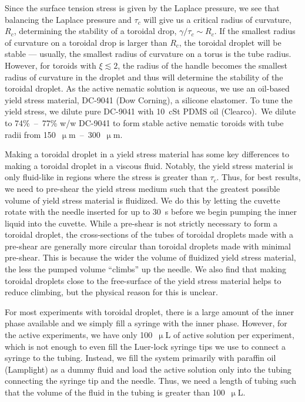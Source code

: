 Since the surface tension stress is given by the Laplace pressure, we see that balancing the Laplace pressure and $\tau_c$ will give us a critical radius of curvature, $R_c$, determining the stability of a toroidal drop, $\gamma/\tau_c \sim R_c$.
If the smallest radius of curvature on a toroidal drop is larger than $R_c$, the toroidal droplet will be stable --- usually, the smallest radius of curvature on a torus is the tube radius.
However, for toroids with $\xi \lesssim 2$, the radius of the handle becomes the smallest radius of curvature in the droplet and thus will determine the stability of the toroidal droplet.
As the active nematic solution is aqueous, we use an oil-based yield stress material, DC-9041 (Dow Corning), a silicone elastomer.
To tune the yield stress, we dilute pure DC-9041 with 10~cSt PDMS oil (Clearco).\
We dilute to 74\%~--~77\% w/w DC-9041 to form stable active nematic toroids with tube radii from 150~$\upmu$m~--~300~$\upmu$m.

Making a toroidal droplet in a yield stress material has some key differences to making a toroidal droplet in a viscous fluid.
Notably, the yield stress material is only fluid-like in regions where the stress is greater than $\tau_c$.
Thus, for best results, we need to pre-shear the yield stress medium such that the greatest possible volume of yield stress material is fluidized.
We do this by letting the cuvette rotate with the needle inserted for up to 30~s before we begin pumping the inner liquid into the cuvette.
While a pre-shear is not strictly necessary to form a toroidal droplet, the cross-sections of the tubes of toroidal droplets made with a pre-shear are generally more circular than toroidal droplets made with minimal pre-shear.
This is because the wider the volume of fluidized yield stress material, the less the pumped volume ``climbs'' up the needle.
We also find that making toroidal droplets close to the free-surface of the yield stress material helps to reduce climbing, but the physical reason for this is unclear.

For most experiments with toroidal droplet, there is a large amount of the inner phase available and we simply fill a syringe with the inner phase.
However, for the active experiments, we have only 100~$\upmu$L of active solution per experiment, which is not enough to even fill the Luer-lock syringe tips we use to connect a syringe to the tubing.
Instead, we fill the system primarily with paraffin oil (Lamplight) as a dummy fluid and load the active solution only into the tubing connecting the syringe tip and the needle.
Thus, we need a length of tubing such that the volume of the fluid in the tubing is greater than 100~$\upmu$L.

